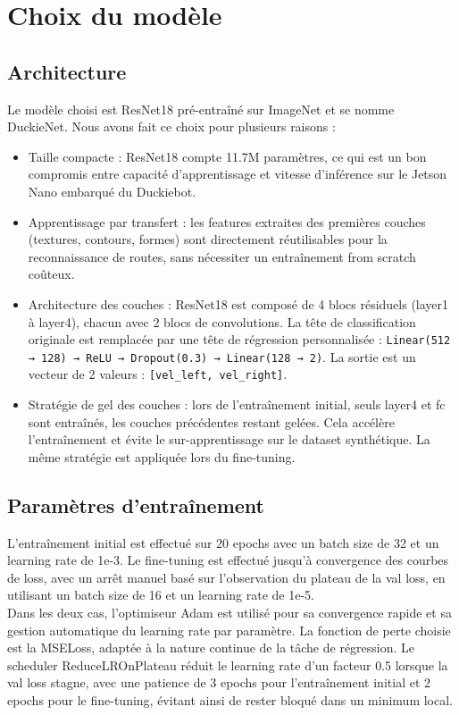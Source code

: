 \section{Choix du modèle}
\subsection{Architecture}
Le modèle choisi est ResNet18 pré-entraîné sur ImageNet et se nomme DuckieNet. Nous avons fait ce choix pour plusieurs raisons : 
\begin{itemize}
  \item Taille compacte : ResNet18 compte 11.7M paramètres, ce qui est un bon compromis entre capacité d'apprentissage et vitesse d'inférence sur le Jetson Nano embarqué du Duckiebot.
  \item Apprentissage par transfert : les features extraites des premières couches (textures, contours, formes) sont directement réutilisables pour la reconnaissance de routes, sans nécessiter un entraînement from scratch coûteux.
  \item Architecture des couches : ResNet18 est composé de 4 blocs résiduels (layer1 à layer4), chacun avec 2 blocs de convolutions. La tête de classification originale est remplacée par une tête de régression personnalisée : \texttt{Linear(512 → 128) → ReLU → Dropout(0.3) → Linear(128 → 2)}. La sortie est un vecteur de 2 valeurs : \texttt{[vel\_left, vel\_right]}.
  \item Stratégie de gel des couches : lors de l'entraînement initial, seuls layer4 et fc sont entraînés, les couches précédentes restant gelées. Cela accélère l'entraînement et évite le sur-apprentissage sur le dataset synthétique. La même stratégie est appliquée lors du fine-tuning.
\end{itemize} 
\subsection{Paramètres d'entraînement}
L'entraînement initial est effectué sur 20 epochs avec un batch size de 32 et un learning rate de 1e-3. Le fine-tuning est effectué jusqu'à convergence des courbes de loss, avec un arrêt manuel basé sur l'observation du plateau de la val loss, en utilisant un batch size de 16 et un learning rate de 1e-5. \\
Dans les deux cas, l'optimiseur Adam est utilisé pour sa convergence rapide et sa gestion automatique du learning rate par paramètre. La fonction de perte choisie est la MSELoss, adaptée à la nature continue de la tâche de régression. Le scheduler ReduceLROnPlateau réduit le learning rate d'un facteur 0.5 lorsque la val loss stagne, avec une patience de 3 epochs pour l'entraînement initial et 2 epochs pour le fine-tuning, évitant ainsi de rester bloqué dans un minimum local.
